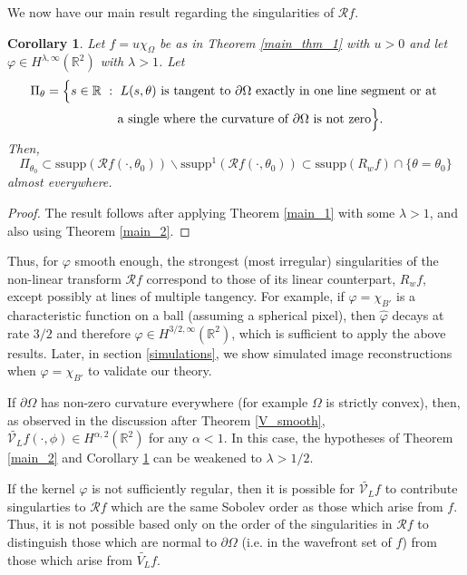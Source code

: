 \documentclass[a4paper,12pt]{amsart}
\numberwithin{equation}{section}
\theoremstyle{plain}
\numberwithin{theorem}{section}
\newtheorem{corollary}[theorem]{Corollary}
\theoremstyle{definition}
\theoremstyle{remark}
\theoremstyle{remark}
\theoremstyle{remark}
\begin{document}
We now have our main result regarding the singularities of $\mathcal{R}f$.
\begin{corollary}
\label{corr_main}
Let $f = u\chi_\Omega$ be as in Theorem \ref{main_thm_1} with $u>0$ and let $\varphi \in H^{\lambda,\infty}(\mathbb{R}^2)$ with $\lambda>1$. Let
\[
\begin{split}
\Pi_\theta & = \Big \{s\in \mathbb{R} \ : \ L(s,\theta) \mbox{ is tangent to $\partial \Omega$ exactly in one line segment or at }\\
&\hskip2cm \mbox{a single where the curvature of $\partial \Omega$ is not zero}\Big \}.
\end{split}
\]
Then,
\begin{equation}
\Pi_{\theta_0} \subset
\text{ssupp}(\mathcal{R}f(\cdot,\theta_0)) \backslash \text{ssupp}^1(\mathcal{R}f(\cdot,\theta_0)) \subset \text{ssupp}(R_wf)\cap \{\theta = \theta_0\}
\end{equation}
almost everywhere.
\end{corollary}
\begin{proof}
The result follows after applying Theorem \ref{main_1} with some $\lambda > 1$, and also using Theorem \ref{main_2}.
\end{proof}

Thus, for $\varphi$ smooth enough, the strongest (most irregular) singularities of the non-linear transform $\mathcal{R}f$ correspond to those of its linear counterpart, $R_w f$, except possibly at lines of multiple tangency. For example, if $\varphi  = \chi_{B'}$ is a characteristic function on a ball (assuming a spherical pixel), then $\hat{\varphi}$ decays at rate $3/2$ \cite{f1,f2} and therefore $\varphi \in H^{3/2,\infty}(\mathbb{R}^2)$, which is sufficient to apply the above results. Later, in section \ref{simulations}, we show simulated image reconstructions when $\varphi = \chi_{B'}$ to validate our theory.

If $\partial \Omega$ has non-zero curvature everywhere (for example $\Omega$ is strictly convex), then, as observed in the discussion after Theorem \ref{V_smooth}, $\widetilde{\mathcal{V}_L} f(\cdot,\phi) \in H^{\alpha,2}(\mathbb{R}^2)$ for any $\alpha < 1$. In this case, the hypotheses of Theorem \ref{main_2} and Corollary \ref{corr_main} can be weakened to $\lambda > 1/2$.

If the kernel $\varphi$ is not sufficiently regular, then it is possible for $\widetilde{\mathcal{V}_L}f$ to contribute singularties to $\mathcal{R}f$ which are the same Sobolev order as those which arise from $f$. Thus, it is not possible based only on the order of the singularities in $\mathcal{R}f$ to distinguish those which are normal to $\partial \Omega$ (i.e. in the wavefront set of $f$) from those which arise from $\widetilde{V_L}f$.
\end{document}
